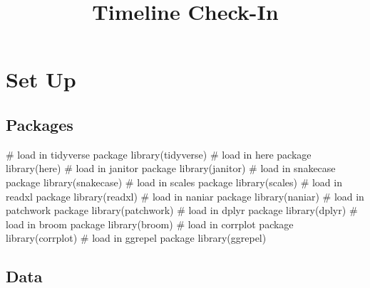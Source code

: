 \documentclass[
  letterpaper,
  DIV=11,
  numbers=noendperiod]{scrartcl}
\title{Timeline Check-In}
\author{}
\date{}
\newenvironment{Shaded}{\begin{snugshade}}{\end{snugshade}}
\newcommand{\CommentTok}[1]{\textcolor[rgb]{0.37,0.37,0.37}{#1}}
\newcommand{\FunctionTok}[1]{\textcolor[rgb]{0.28,0.35,0.67}{#1}}
\newcommand{\NormalTok}[1]{\textcolor[rgb]{0.00,0.23,0.31}{#1}}
\renewcommand*\contentsname{Table of contents}
\newcommand\contentsname{Table of contents}
\begin{document}
\maketitle

\renewcommand*\contentsname{Table of contents}
{
\hypersetup{linkcolor=}
\setcounter{tocdepth}{3}
\tableofcontents
}

\section{Set Up}\label{set-up}

\subsection{Packages}\label{packages}

\begin{Shaded}
\begin{Highlighting}[]
\CommentTok{\# load in tidyverse package}
\FunctionTok{library}\NormalTok{(tidyverse)}
\CommentTok{\# load in here package}
\FunctionTok{library}\NormalTok{(here)}
\CommentTok{\# load in janitor package}
\FunctionTok{library}\NormalTok{(janitor)}
\CommentTok{\# load in snakecase package}
\FunctionTok{library}\NormalTok{(snakecase)}
\CommentTok{\# load in scales package}
\FunctionTok{library}\NormalTok{(scales)}
\CommentTok{\# load in readxl package}
\FunctionTok{library}\NormalTok{(readxl)}
\CommentTok{\# load in naniar package}
\FunctionTok{library}\NormalTok{(naniar)}
\CommentTok{\# load in patchwork package}
\FunctionTok{library}\NormalTok{(patchwork)}
\CommentTok{\# load in dplyr package}
\FunctionTok{library}\NormalTok{(dplyr)}
\CommentTok{\# load in broom package}
\FunctionTok{library}\NormalTok{(broom)}
\CommentTok{\# load in corrplot package}
\FunctionTok{library}\NormalTok{(corrplot)}
\CommentTok{\# load in ggrepel package}
\FunctionTok{library}\NormalTok{(ggrepel)}
\end{Highlighting}
\end{Shaded}

\subsection{Data}\label{data}
\end{document}
